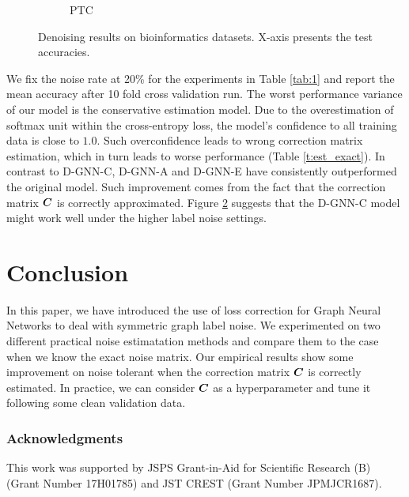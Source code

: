 \documentclass{article} %
\begin{document}
\begin{figure}[h]
\begin{subfigure}{0.33\textwidth}
  \caption{PTC}
  \label{f:ptc_est_back}
\end{subfigure}
\caption{Denoising results on bioinformatics datasets. X-axis presents the test accuracies.}
\label{f:denoising_est_back}
\end{figure}

We fix the noise rate at 20\% for the experiments in Table \ref{tab:1} and report 
the mean accuracy after 10 fold cross validation run.  
The worst performance variance of our model is the conservative estimation model. Due to the 
overestimation of softmax unit within the cross-entropy loss, the model's confidence 
to all training data is close to $1.0$. Such overconfidence leads to wrong correction
matrix estimation, which in turn leads to worse performance (Table \ref{t:est_exact}).
In contrast to D-GNN-C, D-GNN-A and D-GNN-E have consistently outperformed the original
model. Such improvement comes from the fact that the correction matrix ${\bm{C}}$ is correctly 
approximated. Figure \ref{f:denoising_est_back} suggests that the D-GNN-C model might
work well under the higher label noise settings. 

\section{Conclusion}

In this paper, we have introduced the use of loss correction for Graph Neural Networks 
to deal with symmetric graph label noise. We experimented on 
two different practical noise estimatation methods and compare them to the case when we know 
the exact noise matrix. Our empirical results show some improvement 
on noise tolerant when the correction matrix ${\bm{C}}$ is correctly estimated. 
In practice, we can consider ${\bm{C}}$ as a hyperparameter and tune it following some clean validation 
data. 

\subsubsection*{Acknowledgments}

This work was supported by JSPS Grant-in-Aid for Scientific Research (B) (Grant Number 17H01785) 
and JST CREST (Grant Number JPMJCR1687).



\end{document}
